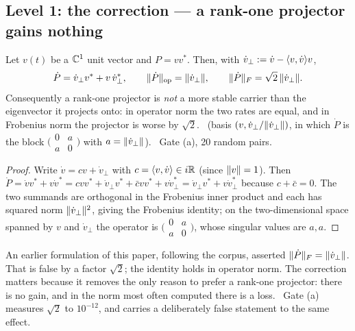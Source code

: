 \subsection{Level 1: the correction --- a rank-one projector gains nothing}

\begin{theorem}\label{thm:rankone}
Let $v(t)$ be a $\mathbb{C}^1$ unit vector and $P=vv^*$. Then, with $\dot v_\perp:=\dot v-\langle v,\dot v\rangle v$,
\begin{equation}\label{eq:rankone}
   \dot P=\dot v_\perp v^*+v\,\dot v_\perp^*,\qquad
   \lVert\dot P\rVert_{\mathrm{op}}=\lVert\dot v_\perp\rVert,\qquad
   \lVert\dot P\rVert_F=\sqrt2\,\lVert\dot v_\perp\rVert.
\end{equation}
Consequently a rank-one projector is \emph{not} a more stable carrier than the eigenvector it
projects onto: in operator norm the two rates are equal, and in Frobenius norm the projector is
worse by $\sqrt2$.
\T\ (basis $(v,\dot v_\perp/\lVert\dot v_\perp\rVert)$, in which $\dot P$ is the block
$\bigl(\begin{smallmatrix}0&a\\a&0\end{smallmatrix}\bigr)$ with $a=\lVert\dot v_\perp\rVert$).
\V\ Gate  (a), 20 random pairs.
\end{theorem}

\begin{proof}
Write $\dot v=cv+\dot v_\perp$ with $c=\langle v,\dot v\rangle\in i\mathbb{R}$ (since $\lVert v\rVert=1$). Then
$\dot P=\dot vv^*+v\dot v^*=cvv^*+\dot v_\perp v^*+\bar cvv^*+v\dot v_\perp^*=\dot v_\perp v^*+v\dot v_\perp^*$
because $c+\bar c=0$. The two summands are orthogonal in the Frobenius inner product and each has
squared norm $\lVert\dot v_\perp\rVert^2$, giving the Frobenius identity; on the two-dimensional space
spanned by $v$ and $\dot v_\perp$ the operator is $\bigl(\begin{smallmatrix}0&a\\a&0\end{smallmatrix}\bigr)$,
whose singular values are $a,a$.
\end{proof}

\begin{remark}\label{rem:hierarchy-correction}
An earlier formulation of this paper, following the corpus, asserted
$\lVert\dot P\rVert_F=\lVert\dot v_\perp\rVert$. That is false by a factor $\sqrt2$; the identity holds in
operator norm. The correction matters because it removes the only reason to prefer a rank-one
projector: there is no gain, and in the norm most often computed there is a loss. \V\ Gate
 (a) measures $\sqrt2$ to $10^{-12}$, and
 carries a deliberately false statement to the same effect.
\end{remark}

